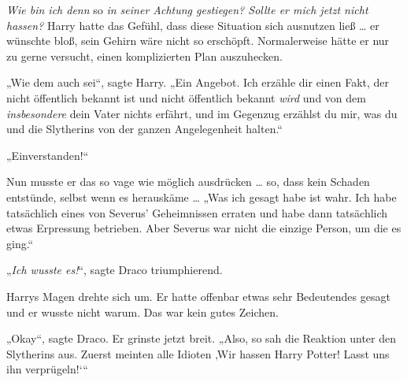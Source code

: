 \emph{Wie bin ich denn} so \emph{in seiner Achtung gestiegen? Sollte er mich jetzt nicht hassen?} Harry hatte das Gefühl, dass diese Situation sich ausnutzen ließ … er wünschte bloß, sein Gehirn wäre nicht so erschöpft. Normalerweise hätte er nur zu gerne versucht, einen komplizierten Plan auszuhecken.

„Wie dem auch sei“, sagte Harry.
„Ein Angebot. Ich erzähle dir einen Fakt, der nicht öffentlich bekannt ist und nicht öffentlich bekannt \emph{wird} und von dem \emph{insbesondere} dein Vater nichts erfährt, und im Gegenzug erzählst du mir, was du und die Slytherins von der ganzen Angelegenheit halten.“

„Einverstanden!“

Nun musste er das so vage wie möglich ausdrücken … so, dass kein Schaden entstünde, selbst wenn es herauskäme …
„Was ich gesagt habe ist wahr. Ich habe tatsächlich eines von Severus’ Geheimnissen erraten und habe dann tatsächlich etwas Erpressung betrieben. Aber Severus war nicht die einzige Person, um die es ging.“

„\emph{Ich wusste es!}“, sagte Draco triumphierend.

Harrys Magen drehte sich um. Er hatte offenbar etwas sehr Bedeutendes gesagt und er wusste nicht warum. Das war kein gutes Zeichen.

„Okay“, sagte Draco. Er grinste jetzt breit.
„Also, so sah die Reaktion unter den Slytherins aus. Zuerst meinten alle Idioten ‚Wir hassen Harry Potter! Lasst uns ihn verprügeln!‘“

